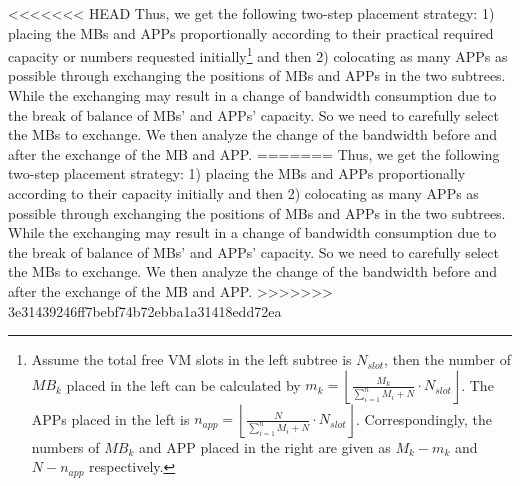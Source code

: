 \documentclass[review]{elsarticle}
\begin{document}
<<<<<<< HEAD
Thus, we get the following two-step placement strategy: 1) placing the MBs and APPs proportionally according to their practical required capacity or numbers requested initially\footnote{Assume the total free VM slots in the left subtree is $N_{slot}$, then the number of $MB_k$ placed in the left can be calculated by $m_k=\left\lfloor\frac{M_k}{\sum\limits_{i=1}^{n}M_i+N}\cdot N_{slot}\right\rfloor$. The APPs placed in the left is $n_{app}=\left\lfloor\frac{N}{\sum\limits_{i=1}^{n}M_i+N}\cdot N_{slot}\right\rfloor$. Correspondingly, the numbers of $MB_k$ and APP placed in the right are given as $M_k-m_k$ and $N-n_{app}$ respectively.}  and then 2) colocating as many APPs as possible through exchanging the positions of MBs and APPs in the two subtrees. While the exchanging may result in a change of bandwidth consumption due to the break of balance of MBs’ and APPs’ capacity. So we need to carefully select the MBs to exchange. We then analyze the change of the bandwidth before and after the exchange of the MB and APP.
=======
Thus, we get the following two-step placement strategy: 1) placing the MBs and APPs proportionally according to their capacity initially and then 2) colocating as many APPs as possible through exchanging the positions of MBs and APPs in the two subtrees. While the exchanging may result in a change of bandwidth consumption due to the break of balance of MBs’ and APPs’ capacity. So we need to carefully select the MBs to exchange. We then analyze the change of the bandwidth before and after the exchange of the MB and APP.
>>>>>>> 3e31439246ff7bebf74b72ebba1a31418edd72ea
\end{document}
